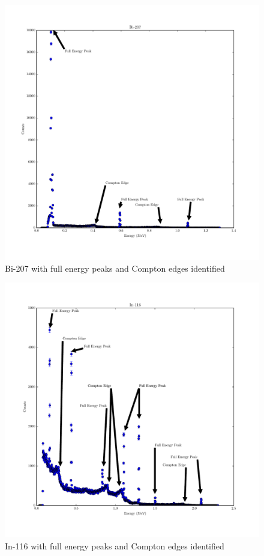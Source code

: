 \documentclass[reprint, nobibnotes, amssymb, amsmath, amsfonts, physics, mathtools, mathrsfs, floatfix]{revtex4-1}
\begin{document}
\begin{widetext}
        \begin{figure}[h]
          \centering
          \includegraphics[width=\linewidth]{../plots/Bi-207.pdf}
          \caption{Bi-207 with full energy peaks and Compton edges identified \label{fig:bi}}
        \end{figure}

        \begin{figure}[h]
          \centering
          \includegraphics[width=\linewidth]{../plots/In-116.pdf}
          \caption{In-116 with full energy peaks and Compton edges identified \label{fig:in}}
        \end{figure}

      \end{widetext}
\end{document}
